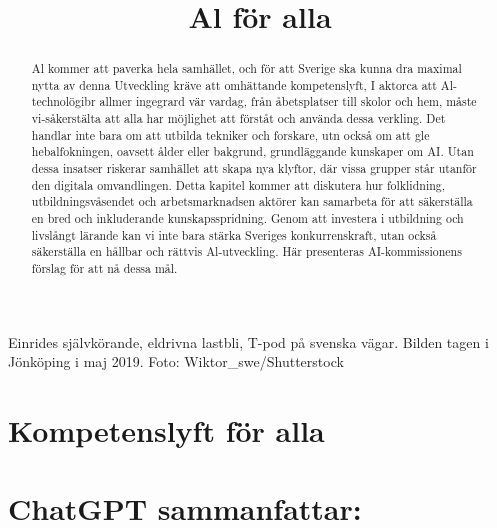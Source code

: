 {{{{{{{{{{{{{{{{Einrides självkörande, eldrivna lastbli, T-pod på svenska vägar. Bilden tagen i Jönköping i maj 2019. Foto: Wiktor_swe/Shutterstock

\title{
Al för alla
}
\section*{Kompetenslyft för alla}
\section*{ChatGPT sammanfattar:}
\begin{abstract}
Al kommer att paverka hela samhället, och för att Sverige ska kunna dra maximal nytta av denna Utveckling kräve att omhättande kompetenslyft, I aktorca att Al-technolögibr allmer ingegrard vär vardag, från åbetsplatser till skolor och hem, måste vi-såkerstälta att alla har möjlighet att förståt och använda dessa verkling. Det handlar inte bara om att utbilda tekniker och forskare, utn också om att gle hebalfokningen, oavsett ålder eller bakgrund, grundläggande kunskaper om AI. Utan dessa insatser riskerar samhället att skapa nya klyftor, där vissa grupper står utanför den digitala omvandlingen.
Detta kapitel kommer att diskutera hur folklidning, utbildningsvåsendet och arbetsmarknadsen aktörer kan samarbeta för att säkerställa en bred och inkluderande kunskapsspridning. Genom att investera i utbildning och livslångt lärande kan vi inte bara stärka Sveriges konkurrenskraft, utan också säkerställa en hållbar och rättvis Al-utveckling. Här presenteras AI-kommissionens förslag för att nå dessa mål.
\end{abstract}
}}}}}}}}}}}}}}}}
